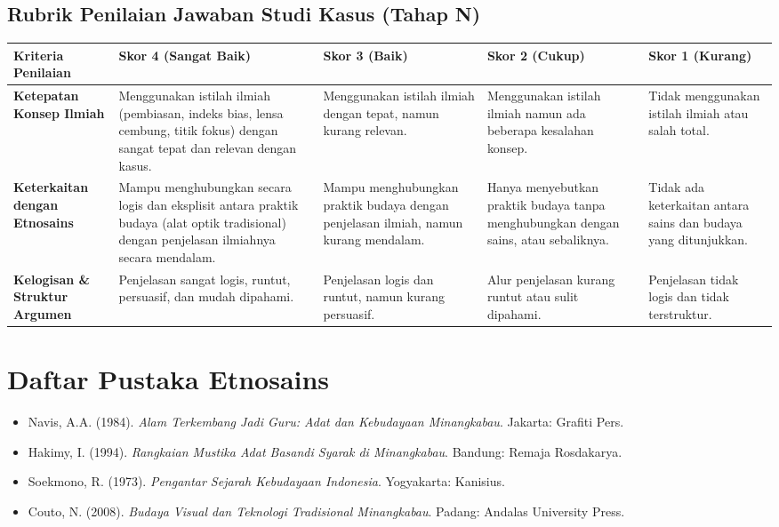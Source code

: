 \documentclass[12pt,a4paper]{article}
\begin{document}
\subsection{Rubrik Penilaian Jawaban Studi Kasus (Tahap N)}

\begin{center}
\begin{tabular}{|p{3cm}|p{3cm}|p{3cm}|p{3cm}|p{3cm}|}
\hline
\textbf{Kriteria Penilaian} & \textbf{Skor 4 (Sangat Baik)} & \textbf{Skor 3 (Baik)} & \textbf{Skor 2 (Cukup)} & \textbf{Skor 1 (Kurang)} \\
\hline
\textbf{Ketepatan Konsep Ilmiah} & Menggunakan istilah ilmiah (pembiasan, indeks bias, lensa cembung, titik fokus) dengan sangat tepat dan relevan dengan kasus. & Menggunakan istilah ilmiah dengan tepat, namun kurang relevan. & Menggunakan istilah ilmiah namun ada beberapa kesalahan konsep. & Tidak menggunakan istilah ilmiah atau salah total. \\
\hline
\textbf{Keterkaitan dengan Etnosains} & Mampu menghubungkan secara logis dan eksplisit antara praktik budaya (alat optik tradisional) dengan penjelasan ilmiahnya secara mendalam. & Mampu menghubungkan praktik budaya dengan penjelasan ilmiah, namun kurang mendalam. & Hanya menyebutkan praktik budaya tanpa menghubungkan dengan sains, atau sebaliknya. & Tidak ada keterkaitan antara sains dan budaya yang ditunjukkan. \\
\hline
\textbf{Kelogisan \& Struktur Argumen} & Penjelasan sangat logis, runtut, persuasif, dan mudah dipahami. & Penjelasan logis dan runtut, namun kurang persuasif. & Alur penjelasan kurang runtut atau sulit dipahami. & Penjelasan tidak logis dan tidak terstruktur. \\
\hline
\end{tabular}
\end{center}

\vspace{1cm}

\section{Daftar Pustaka Etnosains}
\begin{itemize}
\item Navis, A.A. (1984). \textit{Alam Terkembang Jadi Guru: Adat dan Kebudayaan Minangkabau}. Jakarta: Grafiti Pers.
\item Hakimy, I. (1994). \textit{Rangkaian Mustika Adat Basandi Syarak di Minangkabau}. Bandung: Remaja Rosdakarya.
\item Soekmono, R. (1973). \textit{Pengantar Sejarah Kebudayaan Indonesia}. Yogyakarta: Kanisius.
\item Couto, N. (2008). \textit{Budaya Visual dan Teknologi Tradisional Minangkabau}. Padang: Andalas University Press.
\end{itemize}
\end{document}
